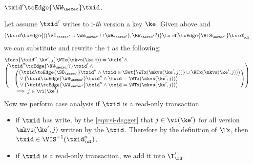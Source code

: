 \begin{itemize}
\begin{itemize}
\begin{itemize}
    \( \txid' \toEdge{\WW_\aexec} \txid\).
\end{itemize}
Let assume \( \txid' \) writes to i-\emph{th} version a key \( \ke \).
Given above and 
\[ (\txid \toEdge{\left( (\SO_{\aexec'} \cup \WW_{\aexec'} \cup \WR_{\aexec'} ) ; \RW_{\aexec'}? \right) } \txid' \toEdge{\VIS_{\aexec'}}  \txid_\cl^n \] we can substitute and rewrite the \( \dagger \) as the following:
\begin{gather}
    \begin{array}{@{}l@{}}
        \fora{\txid'',\ke',j}
        \WTx(\mkvs(\ke,i)) = \txid' \land {} \\
        \left( \begin{array}{@{}l@{}}
        \txid'' \toEdge{\RW_{\aexec'}?} \txid' \land {} \\
        \quad \left(
            \begin{array}{@{}l @{}}
                \left( \begin{array}{@{}l@{}}
                        \txid \toEdge{\SO_{\aexec'}} \txid'' \land 
                        \txid \in \Set{\WTx(\mkvs(\ke',j))} \cup  \RTx(\mkvs(\ke',j))
                \end{array} \right)  \\
                {} \lor 
                \left( \begin{array}{@{}l@{}}
                        \txid \toEdge{\WR_{\aexec'}} \txid'' \land \txid = \WTx(\mkvs(\ke',j))
                \end{array} \right) \\
                {} \lor \left( \begin{array}{@{}l@{}}
                        \txid \toEdge{\WW_{\aexec'}} \txid'' \land \txid = \WTx(\mkvs(\ke',j))
                \end{array} \right) 
                \end{array} \right) 
            \end{array}
            \right)  \\
            \qquad \implies j \in \vi(\ke') 
    \end{array} 
    \label{equ:si-dagger}
\end{gather}
Now we perform case analysis if \( \txid \) is a read-only transaction.
\begin{itemize}
    \item if \( \txid \) has write, by the \cref{equ:si-dagger} that \( j \in \vi(\ke')\) for all version \( \mkvs(\ke', j) \) written by the \( \txid \).
        Therefore by the definition of \( \Tx \), then \( \txid \in \VIS^{-1}(\txid_\cl^n)\).
    \item if \( \txid \) is a read-only transaction, we add it into \( \T'_\rd \).
\end{itemize}


\end{itemize}
\end{itemize}
